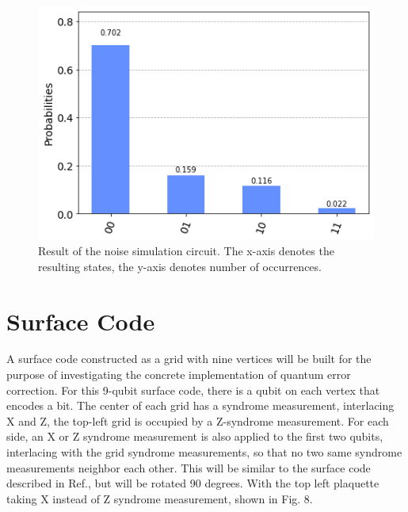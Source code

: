 \documentclass{article}
\begin{document}
\begin{figure}[p]
    \centering
    \includegraphics[width = 0.8\linewidth]{noise/noise.png}
    \caption{Result of the noise simulation circuit. The x-axis denotes the resulting states, the y-axis denotes number of occurrences.}
    \label{fig:my_label}
\end{figure}
\newpage
\section{Surface Code}

A surface code constructed as a grid with nine vertices will be built for the purpose of investigating the concrete implementation of quantum error correction. For this 9-qubit surface code, there is a qubit on each vertex that encodes a bit. The center of each grid has a syndrome measurement, interlacing X and Z, the top-left grid is occupied by a Z-syndrome measurement. For each side, an X or Z syndrome measurement is also applied to the first two qubits, interlacing with the grid syndrome measurements, so that no two same syndrome measurements neighbor each other. This will be similar to the surface code described in Ref.\cite{bravyiCorrectingCoherentErrors2018}, but will be rotated 90 degrees. With the top left plaquette taking X instead of Z syndrome measurement, shown in Fig. 8.
\end{document}
